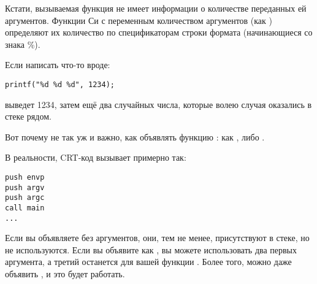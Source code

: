 \par
Кстати, вызываемая функция не имеет информации о количестве переданных ей аргументов.
Функции Си с переменным количеством аргументов (как \printf) определяют их количество по спецификаторам строки формата (начинающиеся со знака \%).

Если написать что-то вроде:

\begin{lstlisting}
printf("%d %d %d", 1234);
\end{lstlisting}

\printf выведет 1234, затем ещё два случайных числа, которые волею случая оказались в стеке рядом.

\par
Вот почему не так уж и важно, как объявлять функцию \main{}: как \main{},  либо .

В реальности, \ac{CRT}-код вызывает \main примерно так:
	
\begin{lstlisting}
push envp
push argv
push argc
call main
...
\end{lstlisting}

Если вы объявляете \main без аргументов, они, тем не менее, присутствуют в стеке, но не используются.
Если вы объявите \main как , 
вы можете использовать два первых аргумента, а третий останется для вашей функции .
Более того, можно даже объявить , и это будет работать.


